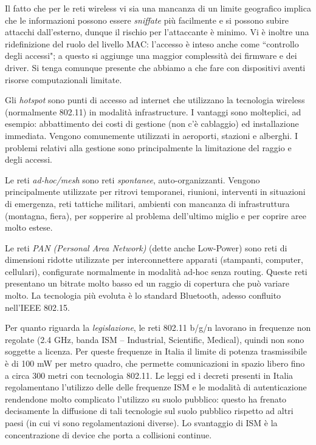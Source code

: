 Il fatto che per le reti wireless vi sia una mancanza di un limite geografico implica che le informazioni possono essere \textit{sniffate} più facilmente e si possono subire attacchi dall'esterno, dunque il rischio per l'attaccante è minimo. Vi è inoltre una ridefinizione del ruolo del livello MAC: l'accesso è inteso anche come \textquotedblleft controllo degli accessi"; a questo si aggiunge una maggior complessità dei firmware e dei driver. Si tenga comunque presente che abbiamo a che fare con dispositivi aventi risorse computazionali limitate.

Gli \textit{hotspot} sono punti di accesso ad internet che utilizzano la tecnologia wireless (normalmente 802.11) in modalità infrastructure. I vantaggi sono molteplici, ad esempio: abbattimento dei costi di gestione (non c'è cablaggio) ed installazione immediata. Vengono comunemente utilizzati in aeroporti, stazioni e alberghi. I problemi relativi alla gestione sono principalmente la limitazione del raggio e degli accessi.

Le reti \textit{ad-hoc/mesh} sono reti \textit{spontanee}, auto-organizzanti. Vengono principalmente utilizzate per ritrovi temporanei, riunioni, interventi in situazioni di emergenza, reti tattiche militari, ambienti con mancanza di infrastruttura (montagna, fiera), per sopperire al problema dell'ultimo miglio e per coprire aree molto estese.

Le reti \textit{PAN (Personal Area Network)} (dette anche Low-Power) sono reti di dimensioni ridotte utilizzate per interconnettere apparati (stampanti, computer, cellulari), configurate normalmente in modalità ad-hoc senza routing. Queste reti presentano un bitrate molto basso ed un raggio di copertura che può variare molto. La tecnologia più evoluta è lo standard Bluetooth, adesso confluito nell'IEEE 802.15.

Per quanto riguarda la \textit{legislazione}, le reti 802.11 b/g/n lavorano in frequenze non regolate (2.4 GHz, banda ISM -- Industrial, Scientific, Medical), quindi non sono soggette a licenza. Per queste frequenze in Italia il limite di potenza trasmissibile è di 100 mW per metro quadro, che permette comunicazioni in spazio libero fino a circa 300 metri con tecnologia 802.11. Le leggi ed i decreti presenti in Italia regolamentano l'utilizzo delle delle frequenze ISM e le modalità di autenticazione rendendone molto complicato l'utilizzo su suolo pubblico: questo ha frenato decisamente la diffusione di tali tecnologie sul suolo pubblico rispetto ad altri paesi (in cui vi sono regolamentazioni diverse). Lo svantaggio di ISM è la concentrazione di device che porta a collisioni continue.

